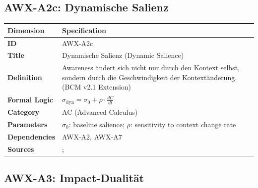 
\subsection{AWX-A2c: Dynamische Salienz}

\begin{table}[htbp]
\small
\begin{tabular}{p{3cm}p{11cm}}
\toprule
\textbf{Dimension} & \textbf{Specification} \\
\midrule
\textbf{ID} & AWX-A2c \\
\textbf{Title} & Dynamische Salienz (Dynamic Salience) \\
\textbf{Definition} & Awareness ändert sich nicht nur durch den Kontext selbst, sondern durch die Geschwindigkeit der Kontextänderung. (BCM v2.1 Extension) \\
\textbf{Formal Logic} & $\sigma_{\text{dyn}} = \sigma_0 + \rho \cdot \frac{dC}{dt}$ \\
\textbf{Category} & AC (Advanced Calculus) \\
\textbf{Parameters} & $\sigma_0$: baseline salience; $\rho$: sensitivity to context change rate \\
\textbf{Dependencies} & AWX-A2, AWX-A7 \\
\textbf{Sources} & \citet{PAP-bordalo2012salience}; \citet{bordalo2013salience} \\
\bottomrule
\end{tabular}
\end{table}


\subsection{AWX-A3: Impact-Dualität}


